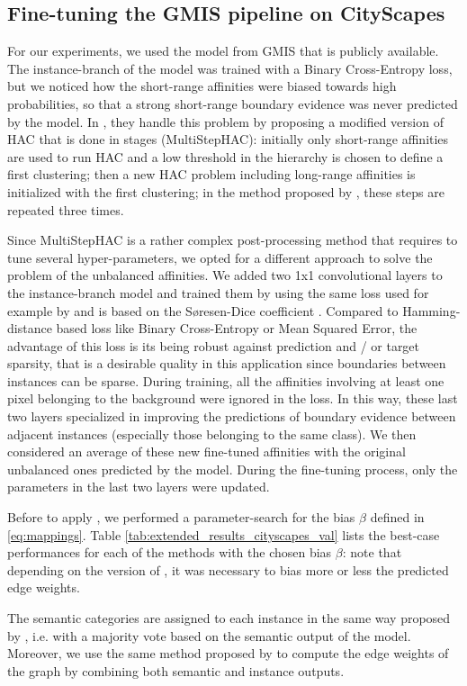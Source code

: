 \subsection{Fine-tuning the GMIS pipeline on CityScapes} \label{sec:appendix_cityscapes}
For our experiments, we used the model from GMIS \cite{liu2018affinity} that is publicly available. The instance-branch of the model was trained with a Binary Cross-Entropy loss, but we noticed how the short-range affinities were biased towards high probabilities, so that a strong short-range boundary evidence was never predicted by the model. In \cite{liu2018affinity}, they handle this problem by proposing a modified version of HAC that is done in stages (MultiStepHAC): initially only short-range affinities are used to run HAC and a low threshold in the hierarchy is chosen to define a first clustering; then a new HAC problem including long-range affinities is  initialized with the first clustering; in the method proposed by \cite{liu2018affinity}, these steps are repeated three times. 

Since MultiStepHAC is a rather complex post-processing method that requires to tune several hyper-parameters, we opted for a different approach to solve the problem of the unbalanced affinities. We added two 1x1 convolutional layers to the instance-branch model and trained them by using the same loss used for example by \cite{wolf2018mutex} and is based on the S\o resen-Dice coefficient \cite{dice1945measures,sorensen1948method}. Compared to Hamming-distance based loss like Binary Cross-Entropy or Mean Squared Error, the advantage of this loss is its being robust against prediction and / or target sparsity, that is a desirable quality in this application since boundaries between instances can be sparse. 
During training, all the affinities involving at least one pixel belonging to the background were ignored in the loss. In this way, these last two layers specialized in improving the predictions of boundary evidence between adjacent instances (especially those belonging to the same class). We then considered an average of these new fine-tuned affinities with the original unbalanced ones predicted by the model. During the fine-tuning process, only the parameters in the last two layers were updated.

Before to apply \algname{}, we performed a parameter-search for the bias $\beta$ defined in \ref{eq:mappings}. Table \ref{tab:extended_results_cityscapes_val} lists the best-case performances for each of the methods with the chosen bias $\beta$: note that depending on the version of \algname{}, it was necessary to bias more or less the predicted edge weights.

The semantic categories are assigned to each instance in the same way proposed by \cite{liu2018affinity}, i.e. with a majority vote based on the semantic output of the model. Moreover, we use the same method  proposed by \cite{liu2018affinity} to compute the edge weights of the graph by combining both semantic and instance outputs. 


